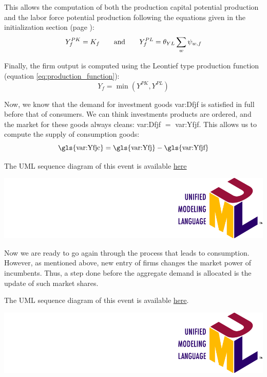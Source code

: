 \documentclass{book}
\newcommand{\doclocation}{file:///Users/giulioni/Documents/workspace/gabriele/docs}
\begin{document}
This allows the computation of both the production capital potential production and the labor force potential production following the equations given in the initialization section (page \pageref{pg:inputs1}):
\[
	Y^{PK}_f=K_f \qquad \textnormal{and} \qquad	Y^{PL}_f=\theta_{YL}\sum_{w}\psi_{w,f}
\]

Finally, the firm output is computed using the Leontief type production function (equation \ref{eq:production_function}):
\[
Y_f=\min(Y^{PK},Y^{PL})
\]

Now, we know that the demand for investment goods \gls{var:Dfjf} is satisfied in full before that of consumers. We can think investments products are ordered, and the market for these goods always cleans: \gls{var:Dfjf} $=$ \gls{var:Yfjf}. This allows us to compute the supply of consumption goods:
\[
	\textnormal{\gls{var:Yfjc}}=\textnormal{\gls{var:Yfj}}-\textnormal{\gls{var:Yfjf}}
\]


\vskip3mm
The UML sequence diagram of this event is available \href{\doclocation/umldoc/makeProduction.html}{here}
\begin{marginfigure}
	\includegraphics[scale=0.1]{uml.png}
\end{marginfigure}
\vskip3mm



Now we are ready to go again through the process that leads to consumption. However, as mentioned above, new entry of firms changes the market power of incumbents. Thus, a step done before the aggregate demand is allocated is the update of such market shares.   


\vskip3mm
The UML sequence diagram of this event is available \href{\doclocation/umldoc/setupNewFirmsToComputeProductAttractiveness.html}{here}.
\begin{marginfigure}
	\includegraphics[scale=0.1]{uml.png}
\end{marginfigure}
\vskip3mm
\end{document}
